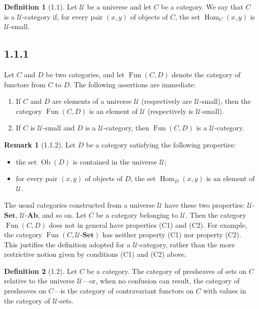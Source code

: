 \documentclass[11pt]{article}
\newcommand{\U}{\mathcal{U}}
\newcommand{\Ens}{\mathbf{Set}}
\newcommand{\Ab}{\mathbf{Ab}}
\newcommand{\Ob}{\operatorname{Ob}}
\newcommand{\Hom}{\operatorname{Hom}}
\newcommand{\Fonct}{\operatorname{Fun}}
\theoremstyle{definition}
\newtheorem*{definitionstar}{Definition}
\newtheorem*{remarkstar}{Remark}
\begin{document}
\begin{definitionstar}[1.1]
Let $\U$ be a universe and let $C$ be a category. We say that $C$ is a $\U$-category if, for every pair $(x,y)$ of objects of $C$, the set $\Hom_C(x,y)$ is $\U$-small.
\end{definitionstar}

\subsection*{1.1.1}

Let $C$ and $D$ be two categories, and let $\Fonct(C,D)$ denote the category of functors from $C$ to $D$. The following assertions are immediate:
\begin{enumerate}
\item[(a)] If $C$ and $D$ are elements of a universe $\U$ (respectively are $\U$-small), then the category $\Fonct(C,D)$ is an element of $\U$ (respectively is $\U$-small).
\item[(b)] If $C$ is $\U$-small and $D$ is a $\U$-category, then $\Fonct(C,D)$ is a $\U$-category.
\end{enumerate}

\begin{remarkstar}[1.1.2]
Let $D$ be a category satisfying the following properties:
\begin{itemize}
\item[(C1)] the set $\Ob(D)$ is contained in the universe $\U$;
\item[(C2)] for every pair $(x,y)$ of objects of $D$, the set $\Hom_D(x,y)$ is an element of $\U$.
\end{itemize}
The usual categories constructed from a universe $\U$ have these two properties: $\U$-$\Ens$, $\U$-$\Ab$, and so on. Let $C$ be a category belonging to $\U$. Then the category $\Fonct(C,D)$ does not in general have properties (C1) and (C2). For example, the category $\Fonct(C,\U\text{-}\Ens)$ has neither property (C1) nor property (C2). This justifies the definition adopted for a $\U$-category, rather than the more restrictive notion given by conditions (C1) and (C2) above.
\end{remarkstar}

\begin{definitionstar}[1.2]
Let $C$ be a category. The category of presheaves of sets on $C$ relative to the universe $\U$---or, when no confusion can result, the category of presheaves on $C$---is the category of contravariant functors on $C$ with values in the category of $\U$-sets.
\end{definitionstar}
\end{document}

